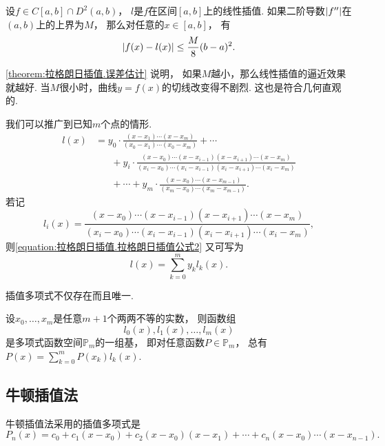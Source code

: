 \begin{theorem}\label{theorem:拉格朗日插值.误差估计}
设\(f\in C[a,b]\cap D^2(a,b)\)，
\(l\)是\(f\)在区间\([a,b]\)上的线性插值.
如果二阶导数\(\abs{f''}\)在\((a,b)\)上的上界为\(M\)，
那么对任意的\(x\in[a,b]\)，
有\[
	\abs{f(x)-l(x)}
	\leq \frac{M}8 (b-a)^2.
\]
\end{theorem}
\begin{remark}
\cref{theorem:拉格朗日插值.误差估计} 说明，
如果\(M\)越小，那么线性插值的逼近效果就越好.
当\(M\)很小时，曲线\(y=f(x)\)的切线改变得不剧烈.
这也是符合几何直观的.
\end{remark}

我们可以推广到已知\(m\)个点的情形.
\begin{equation}\label{equation:拉格朗日插值.拉格朗日插值公式2}
	\begin{aligned}
		l(x)
		&= y_0 \cdot \frac{(x-x_1)\dotsm(x-x_m)}{(x_0-x_1)\dotsm(x_0-x_m)}
		+ \dotsb \\
		&\hspace{20pt}
		+ y_i \cdot \frac{(x-x_0)\dotsm(x-x_{i-1})(x-x_{i+1})\dotsm(x-x_m)}
		{(x_i-x_0)\dotsm(x_i-x_{i-1})(x_i-x_{i+1})\dotsm(x_i-x_m)} \\
		&\hspace{20pt}
		+ \dotsb
		+ y_m \cdot \frac{(x-x_0)\dotsm(x-x_{m-1})}{(x_m-x_0)\dotsm(x_m-x_{m-1})}.
	\end{aligned}
\end{equation}
若记\begin{equation}
	l_i(x) = \frac{(x-x_0)\dotsm(x-x_{i-1})(x-x_{i+1})\dotsm(x-x_m)}
	{(x_i-x_0)\dotsm(x_i-x_{i-1})(x_i-x_{i+1})\dotsm(x_i-x_m)},
\end{equation}
则\cref{equation:拉格朗日插值.拉格朗日插值公式2} 又可写为\begin{equation}
	l(x) = \sum_{k=0}^m y_k l_k(x).
\end{equation}

插值多项式不仅存在而且唯一.
\begin{theorem}
设\(x_0,\dotsc,x_m\)是任意\(m+1\)个两两不等的实数，
则函数组\[
	l_0(x), l_1(x), \dotsc, l_m(x)
\]是多项式函数空间\(\mathbb{P}_m\)的一组基，
即对任意函数\(P\in\mathbb{P}_m\)，
总有\(P(x) = \sum_{k=0}^m P(x_k) l_k(x)\).
\end{theorem}

\subsection{牛顿插值法}
牛顿插值法采用的插值多项式是\[
	P_n(x) = c_0 + c_1 (x-x_0) + c_2 (x-x_0)(x-x_1)
	+ \dotsb + c_n (x-x_0)\dotsm(x-x_{n-1}).
\]

